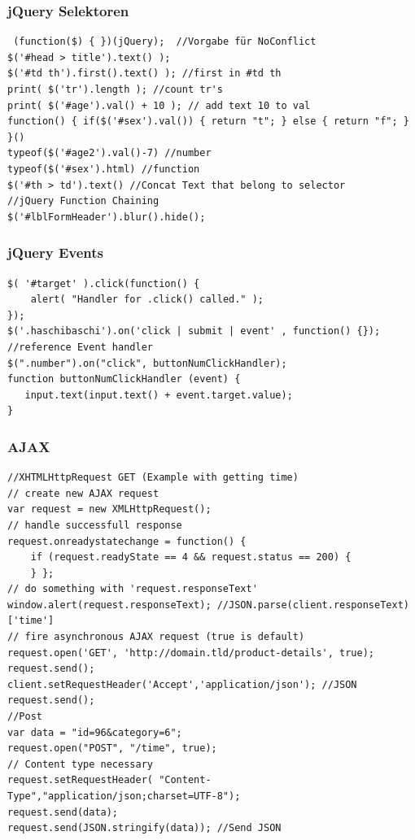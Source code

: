 \begin{multicols*}{4}
\subsubsection{jQuery Selektoren}

 \begin{verbatim}
 (function($) { })(jQuery);  //Vorgabe für NoConflict
$('#head > title').text() );
$('#td th').first().text() ); //first in #td th
print( $('tr').length ); //count tr's
print( $('#age').val() + 10 ); // add text 10 to val
function() { if($('#sex').val()) { return "t"; } else { return "f"; } }()
typeof($('#age2').val()-7) //number
typeof($('#sex').html) //function
$('#th > td').text() //Concat Text that belong to selector
//jQuery Function Chaining
$('#lblFormHeader').blur().hide();
 \end{verbatim}
 
 \subsubsection{jQuery Events}
  \begin{verbatim}
$( '#target' ).click(function() {
    alert( "Handler for .click() called." );
});
$('.haschibaschi').on('click | submit | event' , function() {});
//reference Event handler
$(".number").on("click", buttonNumClickHandler);
function buttonNumClickHandler (event) {
   input.text(input.text() + event.target.value);
}
\end{verbatim}

\subsubsection{AJAX}
\begin{verbatim}
//XHTMLHttpRequest GET (Example with getting time)
// create new AJAX request
var request = new XMLHttpRequest();
// handle successfull response
request.onreadystatechange = function() {
    if (request.readyState == 4 && request.status == 200) {
    } };
// do something with 'request.responseText'
window.alert(request.responseText); //JSON.parse(client.responseText)['time']
// fire asynchronous AJAX request (true is default)
request.open('GET', 'http://domain.tld/product-details', true); 
request.send();
client.setRequestHeader('Accept','application/json'); //JSON
request.send();
//Post
var data = "id=96&category=6";
request.open("POST", "/time", true);
// Content type necessary
request.setRequestHeader( "Content-Type","application/json;charset=UTF-8"); 
request.send(data);
request.send(JSON.stringify(data)); //Send JSON
 \end{verbatim}
 

\end{multicols*}
